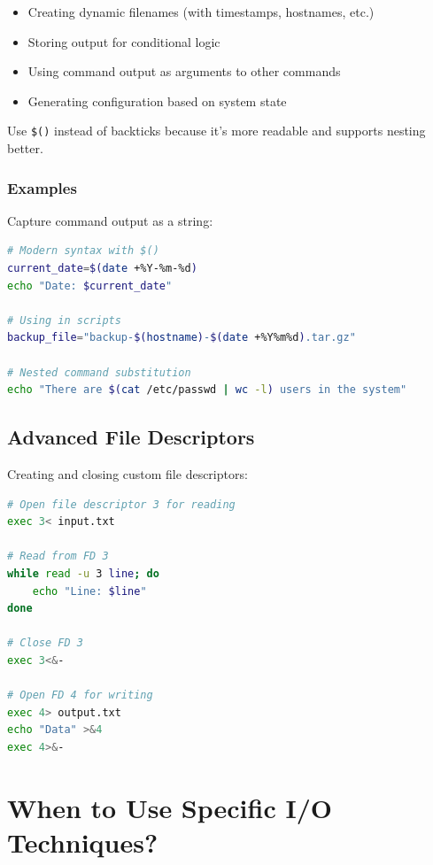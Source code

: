 \begin{itemize}
	\item Creating dynamic filenames (with timestamps, hostnames, etc.)
	\item Storing output for conditional logic
	\item Using command output as arguments to other commands
	\item Generating configuration based on system state
\end{itemize}

\begin{notebox}
	Use \texttt{\$()} instead of backticks because it's more readable and supports nesting better.
\end{notebox}

\subsubsection{Examples}

Capture command output as a string:

\begin{lstlisting}[language=bash, caption={Command substitution}]
# Modern syntax with $()
current_date=$(date +%Y-%m-%d)
echo "Date: $current_date"

# Using in scripts
backup_file="backup-$(hostname)-$(date +%Y%m%d).tar.gz"

# Nested command substitution
echo "There are $(cat /etc/passwd | wc -l) users in the system"
\end{lstlisting}

\subsection{Advanced File Descriptors}

Creating and closing custom file descriptors:

\begin{lstlisting}[language=bash, caption={Custom file descriptors}]
# Open file descriptor 3 for reading
exec 3< input.txt

# Read from FD 3
while read -u 3 line; do
    echo "Line: $line"
done

# Close FD 3
exec 3<&-

# Open FD 4 for writing
exec 4> output.txt
echo "Data" >&4
exec 4>&-
\end{lstlisting}

\section{When to Use Specific I/O Techniques?}
\label{sec:when-to-use}

